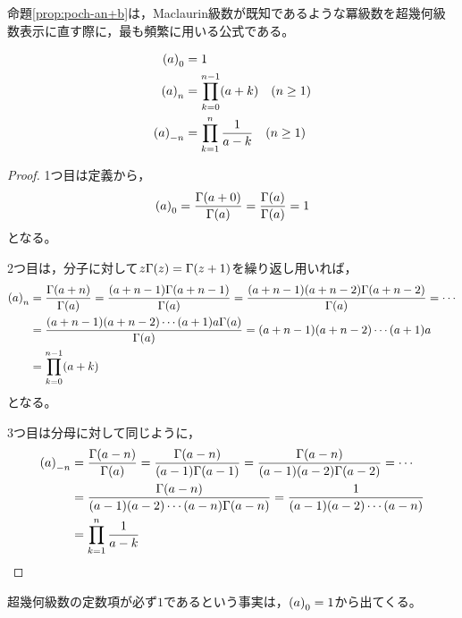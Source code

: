 \documentclass[a4paper,draft]{ltjsarticle}
\begin{document}
命題\ref{prop:poch-an+b}は，Maclaurin級数が既知であるような冪級数を超幾何級数表示に直す際に，最も頻繁に用いる公式である。

\begin{prop}\label{prop:poch-(a)_n=prod(a+k)}
    \begin{align}
        \poch{a}{0}&=1
        \\
        \poch{a}{n}&=\prod_{k=0}^{n-1}\pare{a+k}\quad\pare{n \geq 1}
        \\
        \poch{a}{-n}&=\prod_{k=1}^{n}\frac{1}{a-k}\quad\pare{n\geq 1}
    \end{align}
    \begin{proof}
        1つ目は定義から，
        \begin{equation}
            \poch{a}{0}=\frac{\fun{\Gamma}{a+0}}{\fun{\Gamma}{a}}=\frac{\fun{\Gamma}{a}}{\fun{\Gamma}{a}}=1
        \end{equation}
        となる。

        2つ目は，分子に対して$z\fun{\Gamma}{z}=\fun{\Gamma}{z+1}$を繰り返し用いれば，
        \begin{align}
            \poch{a}{n}&=\frac{\fun{\Gamma}{a+n}}{\fun{\Gamma}{a}}=\frac{\pare{a+n-1}\fun{\Gamma}{a+n-1}}{\fun{\Gamma}{a}}=\frac{\pare{a+n-1}\pare{a+n-2}\fun{\Gamma}{a+n-2}}{\fun{\Gamma}{a}}=\cdots
            \\
            &=\frac{\pare{a+n-1}\pare{a+n-2}\cdots\pare{a+1}a\fun{\Gamma}{a}}{\fun{\Gamma}{a}}=\pare{a+n-1}\pare{a+n-2}\cdots\pare{a+1}a
            \\
            &=\prod_{k=0}^{n-1}\pare{a+k}
        \end{align}
        となる。

        3つ目は分母に対して同じように，
        \begin{align}
            \poch{a}{-n}&=\frac{\fun{\Gamma}{a-n}}{\fun{\Gamma}{a}}=\frac{\fun{\Gamma}{a-n}}{\pare{a-1}\fun{\Gamma}{a-1}}=\frac{\fun{\Gamma}{a-n}}{\pare{a-1}\pare{a-2}\fun{\Gamma}{a-2}}=\cdots
            \\
            &=\frac{\fun{\Gamma}{a-n}}{\pare{a-1}\pare{a-2}\cdots\pare{a-n}\fun{\Gamma}{a-n}}=\frac{1}{\pare{a-1}\pare{a-2}\cdots\pare{a-n}}
            \\
            &=\prod_{k=1}^n\frac{1}{a-k}
        \end{align}
    \end{proof}
\end{prop}

超幾何級数の定数項が必ず$1$であるという事実は，$\poch{a}{0}=1$から出てくる。
\end{document}
